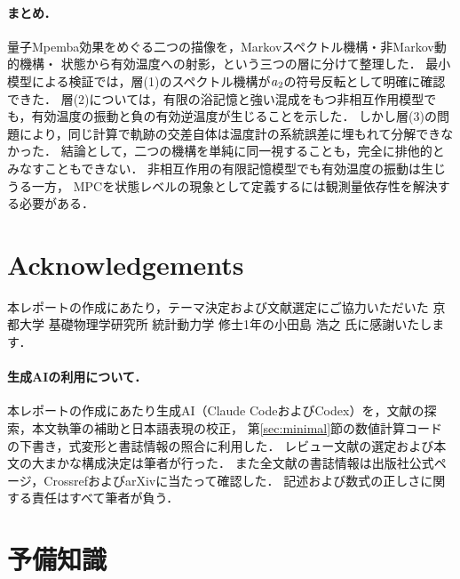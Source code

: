 \documentclass[a4paper,11pt,onecolumn,baselineskip=14.5pt]{jlreq}
\begin{document}
\paragraph{まとめ．}
量子Mpemba効果をめぐる二つの描像を，Markovスペクトル機構・非Markov動的機構・
状態から有効温度への射影，という三つの層に分けて整理した．
最小模型による検証では，層(1)のスペクトル機構が$a_{2}$の符号反転として明確に確認できた．
層(2)については，有限の浴記憶と強い混成をもつ非相互作用模型でも，有効温度の振動と負の有効逆温度が生じることを示した．
しかし層(3)の問題により，同じ計算で軌跡の交差自体は温度計の系統誤差に埋もれて分解できなかった．
結論として，二つの機構を単純に同一視することも，完全に排他的とみなすこともできない．
非相互作用の有限記憶模型でも有効温度の振動は生じうる一方，
MPCを状態レベルの現象として定義するには観測量依存性を解決する必要がある．

\section*{Acknowledgements}
\label{sec:ack}

本レポートの作成にあたり，テーマ決定および文献選定にご協力いただいた
京都大学 基礎物理学研究所 統計動力学 修士1年の小田島 浩之
氏に感謝いたします．

\paragraph{生成AIの利用について．}
本レポートの作成にあたり生成AI（Claude CodeおよびCodex）を，文献の探索，本文執筆の補助と日本語表現の校正，
第\ref{sec:minimal}節の数値計算コードの下書き，式変形と書誌情報の照合に利用した．
レビュー文献の選定および本文の大まかな構成決定は筆者が行った．
また全文献の書誌情報は出版社公式ページ，CrossrefおよびarXivに当たって確認した．
記述および数式の正しさに関する責任はすべて筆者が負う．

\clearpage



\appendix
\section{予備知識}
\label{sec:appendix_prelim}
\end{document}
